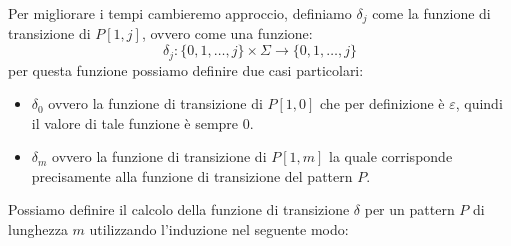 Per migliorare i tempi cambieremo approccio, definiamo $\delta_j$ come la funzione
di transizione di $P[1, j]$, ovvero come una funzione:
\begin{equation}
    \delta_j: \{0, 1, \dots, j\} \times \Sigma \to \{0, 1, \dots, j\}
\end{equation}
per questa funzione possiamo definire due casi particolari:
\begin{itemize}
    \item $\delta_0$ ovvero la funzione di transizione di $P[1, 0]$ che per
          definizione è $\varepsilon$, quindi il valore di tale funzione è sempre
          $0$.
    \item $\delta_m$ ovvero la funzione di transizione di $P[1, m]$ la quale
          corrisponde precisamente alla funzione di transizione del pattern $P$.
\end{itemize}
Possiamo definire il calcolo della funzione di transizione $\delta$ per un pattern
$P$ di lunghezza $m$ utilizzando l'induzione nel seguente modo:
